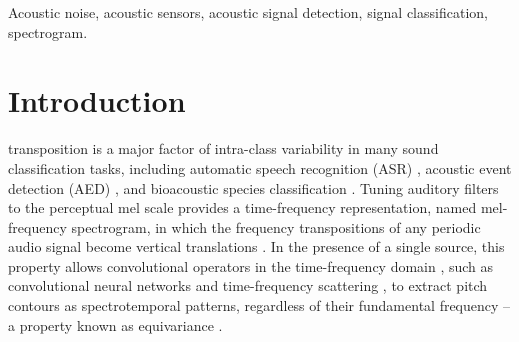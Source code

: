 \documentclass[journal]{IEEEtran}
\theoremstyle{remark}
\begin{document}
\begin{IEEEkeywords}
Acoustic noise, acoustic sensors, acoustic signal detection, signal classification, spectrogram.
\end{IEEEkeywords}

%
\IEEEpeerreviewmaketitle

\section{Introduction}
% 
% 
% 
%
 transposition is a major factor of intra-class variability in many sound classification tasks, including automatic speech recognition (ASR)   \cite{abdel2014taslp}, acoustic event detection (AED) \cite{espi2015eurasip}, and bioacoustic species classification \cite{salamon2017icassp}.
Tuning auditory filters to the perceptual mel scale provides a time-frequency representation, named mel-frequency spectrogram, in which the frequency transpositions of any periodic audio signal become vertical translations \cite{umesh1999icassp}.
In the presence of a single source, this property allows convolutional operators in the time-frequency domain \cite{lostanlen2017phd}, such as convolutional neural networks \cite{abdel2014taslp} and time-frequency scattering \cite{anden2015mlsp}, to extract pitch contours as spectrotemporal patterns, regardless of their fundamental frequency -- a property known as equivariance \cite{kondor2018icml,mallat2016rsta}.
\end{document}
